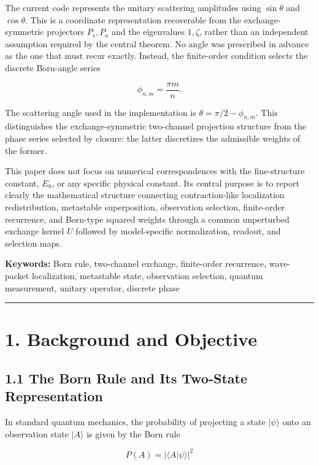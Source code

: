 \documentclass[
  a4paper,
  10pt]{article}
\begin{document}
The current code represents the unitary scattering amplitudes using
\(\sin\theta\) and \(\cos\theta\). This is a coordinate representation
recoverable from the exchange-symmetric projectors \(P_s,P_a\) and the
eigenvalues \(1,\zeta\), rather than an independent assumption required
by the central theorem. No angle was prescribed in advance as the one
that must recur exactly. Instead, the finite-order condition selects the
discrete Born-angle series

\[
\phi_{n,m}=\frac{\pi m}{n}.
\]

The scattering angle used in the implementation is
\(\theta=\pi/2-\phi_{n,m}\). This distinguishes the exchange-symmetric
two-channel projection structure from the phase series selected by
closure: the latter discretizes the admissible weights of the former.

This paper does not focus on numerical correspondences with the
fine-structure constant, \(E_8\), or any specific physical constant. Its
central purpose is to report clearly the mathematical structure
connecting contraction-like localization redistribution, metastable
superposition, observation selection, finite-order recurrence, and
Born-type squared weights through a common unperturbed exchange kernel
\(U\) followed by model-specific normalization, readout, and selection
maps.

\textbf{Keywords:} Born rule, two-channel exchange, finite-order
recurrence, wave-packet localization, metastable state, observation
selection, quantum measurement, unitary operator, discrete phase

\begin{center}\rule{0.5\linewidth}{0.5pt}\end{center}

\section{1. Background and Objective}\label{1-background-and-objective}

\subsection{1.1 The Born Rule and Its Two-State
Representation}\label{11-the-born-rule-and-its-two-state-representation}

In standard quantum mechanics, the probability of projecting a state
\(|\psi\rangle\) onto an observation state \(|A\rangle\) is given by the
Born rule

\[
P(A)=|\langle A|\psi\rangle|^2
\]
\end{document}

